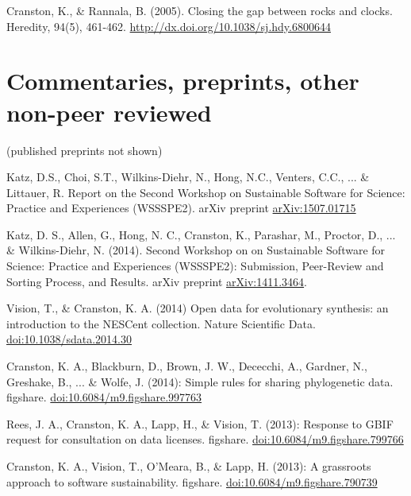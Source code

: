 \documentclass[10pt]{article}
\begin{document}
Cranston, K., \& Rannala, B. (2005). Closing the gap between rocks and clocks. Heredity, 94(5), 461-462. \url{http://dx.doi.org/10.1038/sj.hdy.6800644}

\section*{Commentaries, preprints, other non-peer reviewed}

(published preprints not shown)

Katz, D.S., Choi, S.T., Wilkins-Diehr, N., Hong, N.C., Venters, C.C., ... \& Littauer, R. Report on the Second Workshop on Sustainable Software for Science: Practice and Experiences (WSSSPE2). arXiv preprint \href{http://arxiv.org/abs/1507.01715}{arXiv:1507.01715}

Katz, D. S., Allen, G., Hong, N. C., Cranston, K., Parashar, M., Proctor, D., ... \& Wilkins-Diehr, N. (2014). Second Workshop on on Sustainable Software for Science: Practice and Experiences (WSSSPE2): Submission, Peer-Review and Sorting Process, and Results. arXiv preprint \href{http://arxiv.org/abs/1411.3464}{arXiv:1411.3464}.

Vision, T., \& Cranston, K. A. (2014) Open data for evolutionary synthesis: an introduction to the NESCent collection. Nature Scientific Data. \href{http://dx.doi.org/10.1038/sdata.2014.30}{doi:10.1038/sdata.2014.30}

Cranston, K. A., Blackburn, D., Brown, J. W., Dececchi, A., Gardner, N., Greshake, B., ... \& Wolfe, J. (2014): Simple rules for sharing phylogenetic data. figshare. \href{http://dx.doi.org/10.6084/m9.figshare.997763}{doi:10.6084/m9.figshare.997763}

Rees, J. A., Cranston, K. A., Lapp, H., \& Vision, T. (2013): Response to GBIF request for consultation on data licenses. figshare. \href{http://dx.doi.org/10.6084/m9.figshare.799766}{doi:10.6084/m9.figshare.799766}

Cranston, K. A., Vision, T., O'Meara, B., \& Lapp, H. (2013): A grassroots approach to software sustainability. figshare.
\href{http://dx.doi.org/10.6084/m9.figshare.790739}{doi:10.6084/m9.figshare.790739}

\end{document}
